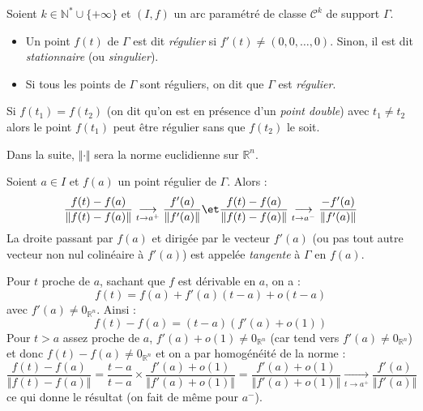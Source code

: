 \documentclass[a4paper,10pt]{report}
\begin{document}
\begin{defin} Soient $k \in \mathbb{N}^* \cup \lbrace + \infty \rbrace$ et $(I,f)$ un arc paramétré de classe $\mathcal{C}^k$ de support $\Gamma$.

\begin{itemize}
\item Un point $f(t)$ de $\Gamma$ est dit \textit{régulier} si $f'(t) \neq (0,0, \ldots, 0)$. Sinon, il est dit \textit{stationnaire} (ou \textit{singulier}).
\item Si tous les points de $\Gamma$ sont réguliers, on dit que $\Gamma$ est \textit{régulier}.
\end{itemize}
\end{defin}

\begin{att} Si $f(t_1) = f(t_2)$ (on dit qu'on est en présence d'un \textit{point double}) avec $t_1 \neq t_2$ alors le point $f(t_1)$ peut être régulier sans que $f(t_2)$ le soit.
\end{att}

\medskip

\noindent Dans la suite, $\Vert \cdot \Vert$ sera la norme euclidienne sur $\mathbb{R}^n$.

\medskip

\begin{defip}
Soient $a \in I$ et $f(a)$ un point régulier de $\Gamma$. Alors :
$$ \dfrac{f(t)-f(a)}{\Vert f(t)-f(a) \Vert} \underset{t \rightarrow a^+}{\longrightarrow} \frac{f'(a)}{\Vert f'(a) \Vert} \et  \dfrac{f(t)-f(a)}{\Vert f(t)-f(a) \Vert} \underset{t \rightarrow a^-}{\longrightarrow} \frac{-f'(a)}{\Vert f'(a) \Vert}$$
La droite passant par $f(a)$ et dirigée par le vecteur $f'(a)$ (ou pas tout autre vecteur non nul colinéaire à $f'(a)$) est appelée \textit{tangente} à $\Gamma$ en $f(a)$.
\end{defip}

\begin{preuve} Pour $t$ proche de $a$, sachant que $f$ est dérivable en $a$, on a :
$$ f(t)=f(a)+f'(a)(t-a)+o(t-a)$$
avec $f'(a) \neq 0_{\mathbb{R}^n}$. Ainsi :
$$ f(t)-f(a)= (t-a) (f'(a)+o(1))$$
Pour $t>a$ assez proche de $a$, $f'(a)+o(1) \neq  0_{\mathbb{R}^n}$ (car tend vers $f'(a) \neq  0_{\mathbb{R}^n}$) et donc $f(t)-f(a) \neq  0_{\mathbb{R}^n}$ et on a par homogénéité de la norme :
$$  \dfrac{f(t)-f(a)}{\Vert f(t)-f(a) \Vert} = \frac{t-a}{t-a} \times \frac{f'(a)+o(1)}{\Vert f'(a)+o(1)\Vert} = \frac{f'(a)+o(1)}{\Vert f'(a)+o(1)\Vert} \underset{t \rightarrow  a^+}{\longrightarrow} \frac{f'(a)}{\Vert f'(a) \Vert}$$
ce qui donne le résultat (on fait de même pour $a^{-}$).
\end{preuve}
\end{document}
